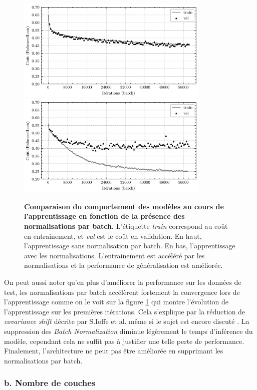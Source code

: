 \documentclass[10pt,twocolumn,letterpaper,french]{article}
\begin{document}
\begin{figure}[!h]
  \centering
  \includegraphics[width=260pt]{images/BN/courbes_sansBN.png} 
  \includegraphics[width=260pt]{images/BN/courbes_avecBN.png} 
  \caption{\textbf{Comparaison du comportement des modèles au cours de l'apprentissage en fonction de la présence des normalisations par batch.} L'étiquette \textit{train} correspond au coût en entrainement, et \textit{val} est le coût en validation. En haut, l'apprentissage sans normalisation par batch. En bas, l'apprentissage avec les normalisations. L'entrainement est accéléré par les normalisations et la performance de généralisation est améliorée.}
  \label{courbes_BN_train}
  \end{figure}
  
On peut aussi noter qu'en plus d'améliorer la performance sur les données de test, les normalisations par batch accélèrent fortement la convergence lors de l'apprentissage comme on le voit sur la figure \ref{courbes_BN_train} qui montre l'évolution de l'apprentissage sur les premières itérations. Cela s'explique par la réduction de \textit{covariance shift} décrite par S.Ioffe et al. \cite{ioffe2015batch} même si le sujet est encore discuté \cite{santurkar2019does}. La suppression des \textit{Batch Normalization} diminue légèrement le temps d'inférence du modèle, cependant cela ne suffit pas à justifier une telle perte de performance. Finalement, l'architecture ne peut pas être améliorée en supprimant les normalisations par batch.


\subsubsection*{b. Nombre de couches}
\end{document}
